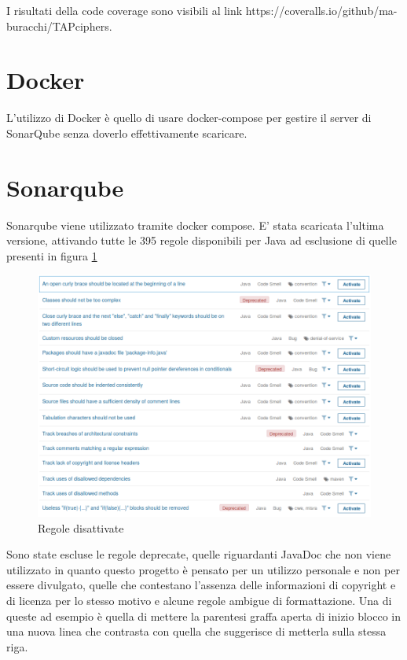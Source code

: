 		I risultati della code coverage sono visibili al link https://coveralls.io/github/ma-buracchi/TAPciphers.
		
	\section{Docker}
		L'utilizzo di Docker è quello di usare docker-compose per gestire il server di SonarQube senza doverlo effettivamente scaricare. 
		
	\section{Sonarqube}
		Sonarqube viene utilizzato tramite docker compose. E' stata scaricata l'ultima versione, attivando tutte le 395 regole disponibili per Java ad esclusione di quelle presenti in figura \ref{fig:sonarules}
		
		\begin{figure}[h]
			\centering
			\includegraphics[scale=0.4]{img/sonarqube_rules}
			\caption{Regole disattivate}
			\label{fig:sonarules}
		\end{figure}
		
		Sono state escluse le regole deprecate, quelle riguardanti JavaDoc che non viene utilizzato in quanto questo progetto è pensato per un utilizzo personale e non per essere divulgato, quelle che contestano l'assenza delle informazioni di copyright e di licenza per lo stesso motivo e alcune regole ambigue di formattazione. Una di queste ad esempio è quella di mettere la parentesi graffa aperta di inizio blocco in una nuova linea che contrasta con quella che suggerisce di metterla sulla stessa riga.
		
